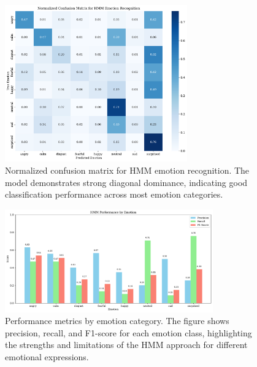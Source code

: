 \begin{figure}[htbp]
    \centering
    \includegraphics[width=0.7\textwidth]{confusion_matrix_norm_20250609_220352.pdf}
    \caption{Normalized confusion matrix for HMM emotion recognition. The model demonstrates strong diagonal dominance, indicating good classification performance across most emotion categories.}
    \label{fig:confusion_matrix}
\end{figure}

\begin{figure}[htbp]
    \centering
    \includegraphics[width=0.8\textwidth]{performance_by_emotion_20250609_220352.pdf}
    \caption{Performance metrics by emotion category. The figure shows precision, recall, and F1-score for each emotion class, highlighting the strengths and limitations of the HMM approach for different emotional expressions.}
    \label{fig:performance_comparison}
\end{figure}

